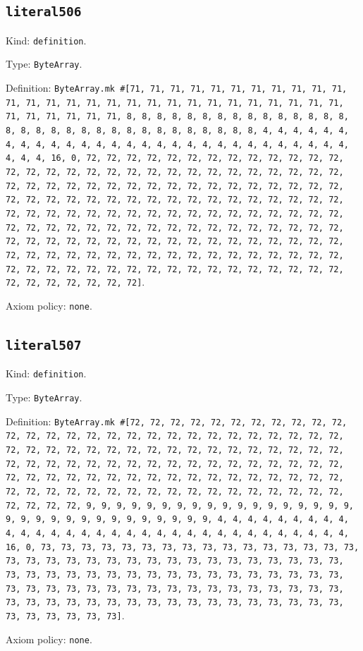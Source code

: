 \documentclass[11pt]{article}
\begin{document}
\subsection*{\texttt{literal506}}
\noindent Kind: \texttt{definition}.\par
\noindent Type: \texttt{ByteArray}.\par
\noindent Definition: \texttt{ByteArray.mk \#[71, 71, 71, 71, 71, 71, 71, 71, 71, 71, 71, 71, 71, 71, 71, 71, 71, 71, 71, 71, 71, 71, 71, 71, 71, 71, 71, 71, 71, 71, 71, 71, 71, 71, 8, 8, 8, 8, 8, 8, 8, 8, 8, 8, 8, 8, 8, 8, 8, 8, 8, 8, 8, 8, 8, 8, 8, 8, 8, 8, 8, 8, 8, 8, 8, 8, 4, 4, 4, 4, 4, 4, 4, 4, 4, 4, 4, 4, 4, 4, 4, 4, 4, 4, 4, 4, 4, 4, 4, 4, 4, 4, 4, 4, 4, 4, 4, 4, 16, 0, 72, 72, 72, 72, 72, 72, 72, 72, 72, 72, 72, 72, 72, 72, 72, 72, 72, 72, 72, 72, 72, 72, 72, 72, 72, 72, 72, 72, 72, 72, 72, 72, 72, 72, 72, 72, 72, 72, 72, 72, 72, 72, 72, 72, 72, 72, 72, 72, 72, 72, 72, 72, 72, 72, 72, 72, 72, 72, 72, 72, 72, 72, 72, 72, 72, 72, 72, 72, 72, 72, 72, 72, 72, 72, 72, 72, 72, 72, 72, 72, 72, 72, 72, 72, 72, 72, 72, 72, 72, 72, 72, 72, 72, 72, 72, 72, 72, 72, 72, 72, 72, 72, 72, 72, 72, 72, 72, 72, 72, 72, 72, 72, 72, 72, 72, 72, 72, 72, 72, 72, 72, 72, 72, 72, 72, 72, 72, 72, 72, 72, 72, 72, 72, 72, 72, 72, 72, 72, 72, 72, 72, 72, 72, 72, 72, 72, 72, 72, 72, 72, 72, 72, 72, 72, 72, 72]}.\par
\noindent Axiom policy: \texttt{none}.\par
\subsection*{\texttt{literal507}}
\noindent Kind: \texttt{definition}.\par
\noindent Type: \texttt{ByteArray}.\par
\noindent Definition: \texttt{ByteArray.mk \#[72, 72, 72, 72, 72, 72, 72, 72, 72, 72, 72, 72, 72, 72, 72, 72, 72, 72, 72, 72, 72, 72, 72, 72, 72, 72, 72, 72, 72, 72, 72, 72, 72, 72, 72, 72, 72, 72, 72, 72, 72, 72, 72, 72, 72, 72, 72, 72, 72, 72, 72, 72, 72, 72, 72, 72, 72, 72, 72, 72, 72, 72, 72, 72, 72, 72, 72, 72, 72, 72, 72, 72, 72, 72, 72, 72, 72, 72, 72, 72, 72, 72, 72, 72, 72, 72, 72, 72, 72, 72, 72, 72, 72, 72, 72, 72, 72, 72, 72, 72, 9, 9, 9, 9, 9, 9, 9, 9, 9, 9, 9, 9, 9, 9, 9, 9, 9, 9, 9, 9, 9, 9, 9, 9, 9, 9, 9, 9, 9, 9, 9, 9, 4, 4, 4, 4, 4, 4, 4, 4, 4, 4, 4, 4, 4, 4, 4, 4, 4, 4, 4, 4, 4, 4, 4, 4, 4, 4, 4, 4, 4, 4, 4, 4, 16, 0, 73, 73, 73, 73, 73, 73, 73, 73, 73, 73, 73, 73, 73, 73, 73, 73, 73, 73, 73, 73, 73, 73, 73, 73, 73, 73, 73, 73, 73, 73, 73, 73, 73, 73, 73, 73, 73, 73, 73, 73, 73, 73, 73, 73, 73, 73, 73, 73, 73, 73, 73, 73, 73, 73, 73, 73, 73, 73, 73, 73, 73, 73, 73, 73, 73, 73, 73, 73, 73, 73, 73, 73, 73, 73, 73, 73, 73, 73, 73, 73, 73, 73, 73, 73, 73, 73, 73, 73, 73, 73]}.\par
\noindent Axiom policy: \texttt{none}.\par
\end{document}
